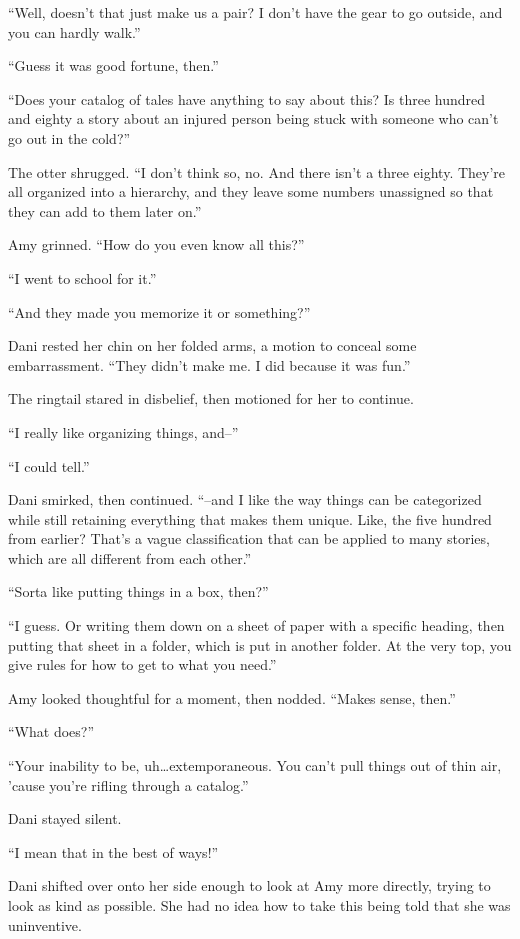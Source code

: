 ``Well, doesn't that just make us a pair? I don't have the gear to go outside, and you can hardly walk.''

``Guess it was good fortune, then.''

``Does your catalog of tales have anything to say about this? Is three hundred and eighty a story about an injured person being stuck with someone who can't go out in the cold?''

The otter shrugged. ``I don't think so, no. And there isn't a three eighty. They're all organized into a hierarchy, and they leave some numbers unassigned so that they can add to them later on.''

Amy grinned. ``How do you even know all this?''

``I went to school for it.''

``And they made you memorize it or something?''

Dani rested her chin on her folded arms, a motion to conceal some embarrassment. ``They didn't make me. I did because it was fun.''

The ringtail stared in disbelief, then motioned for her to continue.

``I really like organizing things, and--''

``I could tell.''

Dani smirked, then continued. ``--and I like the way things can be categorized while still retaining everything that makes them unique. Like, the five hundred from earlier? That's a vague classification that can be applied to many stories, which are all different from each other.''

``Sorta like putting things in a box, then?''

``I guess. Or writing them down on a sheet of paper with a specific heading, then putting that sheet in a folder, which is put in another folder. At the very top, you give rules for how to get to what you need.''

Amy looked thoughtful for a moment, then nodded. ``Makes sense, then.''

``What does?''

``Your inability to be, uh\ldots{}extemporaneous. You can't pull things out of thin air, 'cause you're rifling through a catalog.''

Dani stayed silent.

``I mean that in the best of ways!''

Dani shifted over onto her side enough to look at Amy more directly, trying to look as kind as possible. She had no idea how to take this being told that she was uninventive.

